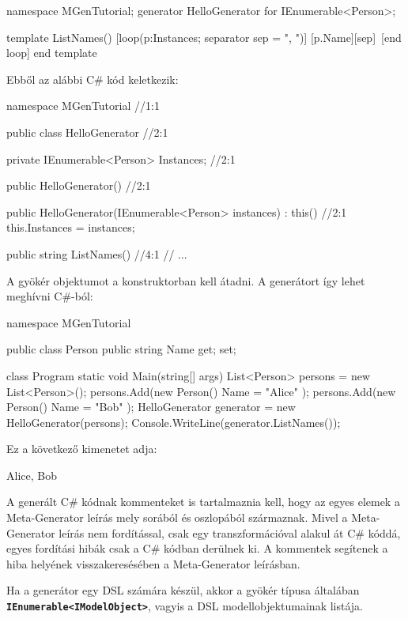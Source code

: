\documentclass[12pt, a4paper]{report}
\newcommand{\ff}[1]{\textbf{\texttt{#1}}}
\begin{document}
\begin{mgencode}
namespace MGenTutorial;
generator HelloGenerator for IEnumerable<Person>;

template ListNames()
  [loop(p:Instances; separator sep = ", ")]
[p.Name][sep]\
  [end loop]
end template
\end{mgencode}

Ebből az alábbi C\# kód keletkezik:

\begin{csharpcode}
namespace MGenTutorial //1:1
{
	public class HelloGenerator //2:1
	{
		private IEnumerable<Person> Instances; //2:1
		
		public HelloGenerator() //2:1
		{
		}
		
		public HelloGenerator(IEnumerable<Person> instances) : this() //2:1
		{
			this.Instances = instances;
		}
		
		public string ListNames() //4:1
		{
			// ...
		}
	}
}
\end{csharpcode}

A gyökér objektumot a konstruktorban kell átadni. A generátort így lehet meghívni C\#-ból:

\begin{csharpcode}
namespace MGenTutorial
{
	public class Person
	{
		public string Name { get; set; }
	}
	
	class Program
	{
		static void Main(string[] args)
		{
			List<Person> persons = new List<Person>();
			persons.Add(new Person() { Name = "Alice" });
			persons.Add(new Person() { Name = "Bob" });
			HelloGenerator generator = new HelloGenerator(persons);
			Console.WriteLine(generator.ListNames());
		}
	}
}
\end{csharpcode}

Ez a következő kimenetet adja:

\begin{textcode}
Alice, Bob
\end{textcode}

A generált C\# kódnak kommenteket is tartalmaznia kell, hogy az egyes elemek a Meta-Generator leírás mely sorából és oszlopából származnak. Mivel a Meta-Generator leírás nem fordítással, csak egy transzformációval alakul át C\# kóddá, egyes fordítási hibák csak a C\# kódban derülnek ki. A kommentek segítenek a hiba helyének visszakeresésében a Meta-Generator leírásban.

Ha a generátor egy DSL számára készül, akkor a gyökér típusa általában \ff{IEnumerable<IModel\-Object>}, vagyis a DSL modellobjektumainak listája.
\end{document}
